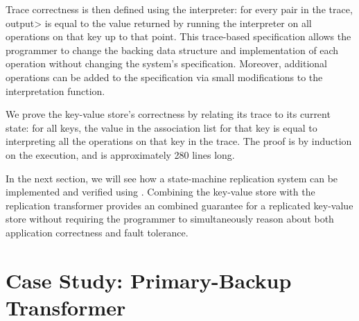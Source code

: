 Trace correctness is then defined using the interpreter: for every
 pair in the trace,
\<output> is equal to the value returned by running the
interpreter on all operations on that key up to that point.
This trace-based specification allows the programmer to change the
backing data structure and implementation of each operation
without changing the system's specification. Moreover, additional
operations can be added to the specification via small modifications to the
interpretation function.

We prove the key-value store's correctness by relating its trace to
its current state: for all keys, the value in the association list for
that key is equal to interpreting all the operations on that key in
the trace. The proof is by induction on the execution, and is
approximately 280 lines long.

In the next section, we will see how a state-machine replication
system can be implemented and verified using \Verdi. Combining the
key-value store with the replication transformer provides an
combined guarantee for a replicated key-value store without
requiring the programmer to simultaneously reason about both
application correctness and fault tolerance.

\section{Case Study: Primary-Backup Transformer}\label{sec:verdi:casestudy-pbj}

